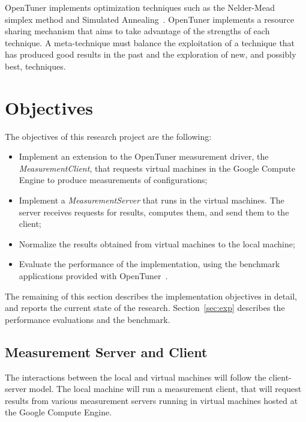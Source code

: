\documentclass[a4paper, 12pt]{article}
\begin{document}
OpenTuner implements optimization techniques such as the
Nelder-Mead~\cite{nelder1965simplex} simplex
method and Simulated Annealing~\cite{kirkpatrick1983optimization}.
OpenTuner implements a resource sharing mechanism that aims to take
advantage of the strengths of each technique. A meta-technique
must balance the exploitation of a technique that has produced
good results in the past and the exploration of new, and possibly
best, techniques.

\section{Objectives} \label{sec:obj}

The objectives of this research project are the following:

\begin{itemize}
    \item Implement an extension to the OpenTuner measurement driver,
        the \emph{MeasurementClient}, that requests virtual
        machines in the Google Compute Engine to produce
        measurements of configurations;
    \item Implement a \emph{MeasurementServer} that runs
        in the virtual machines. The server receives
        requests for results, computes them, and send
        them to the client;
    \item Normalize the results obtained from virtual machines
        to the local machine;
    \item Evaluate the performance of the implementation,
        using the benchmark applications provided with
        OpenTuner~\cite{ansel2014opentuner}.
\end{itemize}

The remaining of this section describes the implementation objectives in
detail, and reports the current state of the research. Section~\ref{sec:exp}
describes the performance evaluations and the benchmark.

\subsection{Measurement Server and Client}

The interactions between the local and virtual machines
will follow the client-server model. The local machine
will run a measurement client, that will request
results from various measurement servers running in
virtual machines hosted at the Google Compute Engine.
\end{document}
